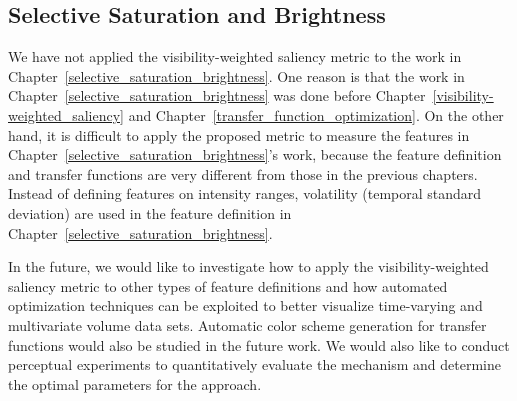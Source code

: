\subsection{Selective Saturation and Brightness}
We have not applied the visibility-weighted saliency metric to the work in Chapter~\ref{selective_saturation_brightness}. One reason is that the work in Chapter~\ref{selective_saturation_brightness} was done before Chapter~\ref{visibility-weighted_saliency} and Chapter~\ref{transfer_function_optimization}. On the other hand, it is difficult to apply the proposed metric to measure the features in Chapter~\ref{selective_saturation_brightness}'s work, because the feature definition and transfer functions are very different from those in the previous chapters. Instead of defining features on intensity ranges, volatility (temporal standard deviation) are used in the feature definition in Chapter~\ref{selective_saturation_brightness}.

In the future, we would like to investigate how to apply the visibility-weighted saliency metric to other types of feature definitions and how automated optimization techniques can be exploited to better visualize time-varying and multivariate volume data sets. Automatic color scheme generation \cite{zhou_automatic_2009} for transfer functions would also be studied in the future work.
We would also like to conduct perceptual experiments to quantitatively evaluate the mechanism and determine the optimal parameters for the approach.


